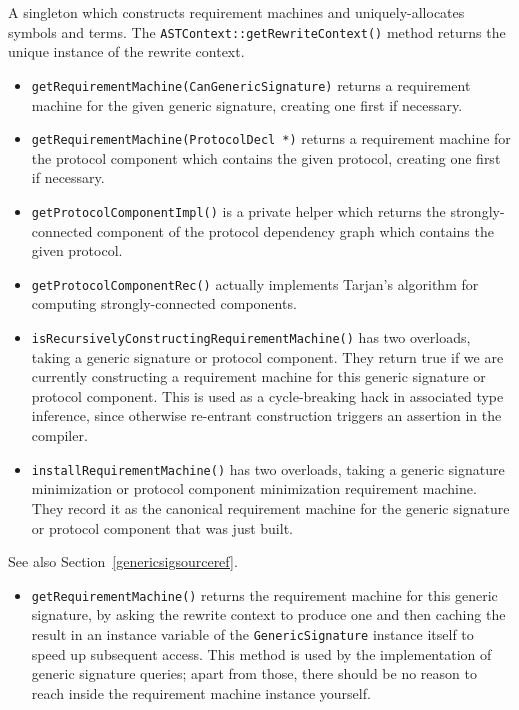 \documentclass[../generics]{subfiles}
\begin{document}
A singleton which constructs requirement machines and uniquely-allocates symbols and terms. The \texttt{ASTContext::getRewriteContext()} method returns the unique instance of the rewrite context.
\begin{itemize}
\item \texttt{getRequirementMachine(CanGenericSignature)} returns a requirement machine for the given generic signature, creating one first if necessary.
\item \texttt{getRequirementMachine(ProtocolDecl *)} returns a requirement machine for the protocol component which contains the given protocol, creating one first if necessary.
\item \texttt{getProtocolComponentImpl()} is a private helper which returns the strongly-connected component of the protocol dependency graph which contains the given protocol.
\item \texttt{getProtocolComponentRec()} actually implements Tarjan's algorithm for computing strongly-connected components.
\item \texttt{isRecursivelyConstructingRequirementMachine()} has two overloads, taking a generic signature or protocol component. They return true if we are currently constructing a requirement machine for this generic signature or protocol component. This is used as a cycle-breaking hack in associated type inference, since otherwise re-entrant construction triggers an assertion in the compiler.
\item \texttt{installRequirementMachine()} has two overloads, taking a generic signature minimization or  protocol component minimization requirement machine. They record it as the canonical requirement machine for the generic signature or protocol component that was just built.
\end{itemize}

See also Section~\ref{genericsigsourceref}.
\begin{itemize}
\item \texttt{getRequirementMachine()} returns the requirement machine for this generic signature, by asking the rewrite context to produce one and then caching the result in an instance variable of the \texttt{GenericSignature} instance itself to speed up subsequent access. This method is used by the implementation of generic signature queries; apart from those, there should be no reason to reach inside the requirement machine instance yourself.
\end{itemize}
\end{document}
